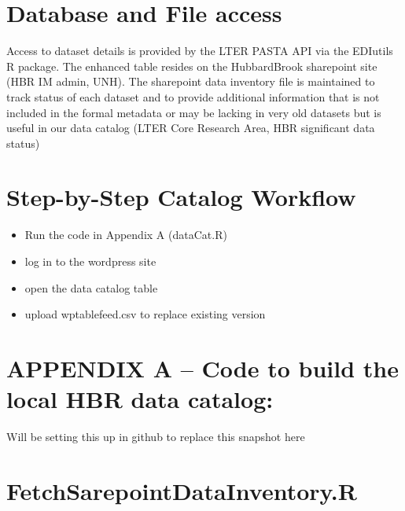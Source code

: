 \documentclass[
  letterpaper,
  DIV=11,
  numbers=noendperiod]{scrreprt}
\providecommand{\tightlist}{%
  \setlength{\itemsep}{0pt}\setlength{\parskip}{0pt}}\usepackage{longtable,booktabs,array}
\begin{document}
\section{Database and File access}\label{database-and-file-access}

Access to dataset details is provided by the LTER PASTA API via the
EDIutils R package. The enhanced table resides on the HubbardBrook
sharepoint site (HBR IM admin, UNH). The sharepoint data inventory file
is maintained to track status of each dataset and to provide additional
information that is not included in the formal metadata or may be
lacking in very old datasets but is useful in our data catalog (LTER
Core Research Area, HBR significant data status)

\section{Step-by-Step Catalog
Workflow}\label{step-by-step-catalog-workflow}

\begin{itemize}
\tightlist
\item
  Run the code in Appendix A (dataCat.R)
\item
  log in to the wordpress site
\item
  open the data catalog table
\item
  upload wptablefeed.csv to replace existing version
\end{itemize}

\section{APPENDIX A -- Code to build the local HBR data
catalog:}\label{appendix-a-code-to-build-the-local-hbr-data-catalog}

Will be setting this up in github to replace this snapshot here

\section{FetchSarepointDataInventory.R}\label{fetchsarepointdatainventory.r}
\end{document}
